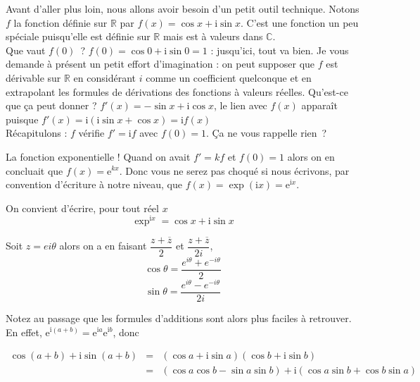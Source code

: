 \documentclass[french]{book}
\newcommand{\bbr}{\mathbb {R}}
\newcommand{\bbc}{\mathbb {C}}
\begin{document}
Avant d'aller plus loin, nous allons avoir besoin d'un petit outil technique. Notons $f$ la fonction définie sur $\bbr$ par $f(x)=\cos x+\mathrm{i}\sin x$. C'est une fonction un peu spéciale puisqu'elle est définie sur $\bbr$ mais est à valeurs dans $\bbc$.\\

 Que vaut $f(0)$~? $f(0)=\cos 0+\mathrm{i}\sin 0=1$ : jusqu'ici, tout va bien.
Je vous demande à présent un petit effort d'imagination : on peut supposer que $f$ est dérivable sur $\bbr$ en considérant $i$ comme
un coefficient quelconque et en extrapolant les formules de dérivations des fonctions à valeurs réelles. Qu'est-ce que ça peut donner ? $f'(x)=-\sin x+\mathrm{i}\cos x$, le lien avec $f(x)$ apparaît puisque $f'(x)=\mathrm{i}(\mathrm{i}\sin x+\cos x)=\mathrm{i} f(x)$\\ 

Récapitulons : $f$ vérifie $f'=\mathrm{i} f$ avec $f(0)=1$. Ça ne vous rappelle rien~? 

La fonction exponentielle ! Quand on avait $f'=kf$ et $f(0)=1$ alors on en concluait que $f(x)=\mathrm{e}^{kx}$. Donc vous ne  serez pas choqué si nous écrivons, par convention  d'écriture à notre niveau, que $f(x)=\exp(\mathrm{i} x)=\mathrm{e}^{\mathrm{i} x}$. 


\begin{thm}
  On convient d'écrire, pour tout réel $x$ $$\exp^{\mathrm{i} x}=\cos x+\mathrm{i}\sin x$$
\end{thm}

\begin{thm}
Soit $z=e{i\theta}$ alors on a en faisant $\dfrac{z+\overline{z}}{2}$ et $\dfrac{z+\overline{z}}{2i}$, \\
$$\cos \theta = \dfrac{e^{i \theta} +e^{-i \theta}} {2}$$
$$\sin \theta = \dfrac{e^{i \theta} -e^{-i \theta}} {2i}$$
\end{thm}


Notez  au passage  que les  formules d'additions  sont  alors plus  faciles à  retrouver. En  effet,
$\mathrm{e}^{\mathrm{i}(a+b)}=\mathrm{e}^{\mathrm{i} a}\mathrm{e}^{\mathrm{i} b}$, donc

\begin{eqnarray*}
  \cos(a+b)+\mathrm{i}\sin(a+b)&=&(\cos a+\mathrm{i}\sin a)(\cos b+\mathrm{i}\sin b)\\
&=&(\cos a\cos b-\sin a\sin b)+\mathrm{i}(\cos a\sin b+\cos b\sin a)
\end{eqnarray*}
\end{document}
